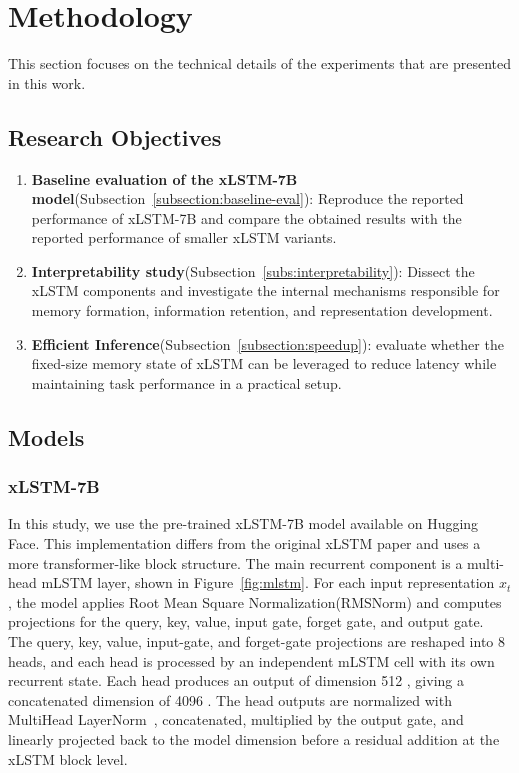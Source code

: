 \section{Methodology}
\label{ch:method}

This section focuses on the technical details of the experiments that are presented in this work. 

\subsection{Research Objectives}

\begin{enumerate}
    \item \textbf{Baseline evaluation of the xLSTM-7B model}(Subsection~\ref{subsection:baseline-eval}): Reproduce the reported performance of 
    xLSTM-7B and compare the obtained results with the reported performance of smaller xLSTM variants.
    \item \textbf{Interpretability study}(Subsection~\ref{subs:interpretability}): Dissect the xLSTM components and investigate the internal mechanisms 
    responsible for memory formation, information retention, and representation development.
    \item \textbf{Efficient Inference}(Subsection~\ref{subsection:speedup}): evaluate whether the fixed-size memory state of 
    xLSTM can be leveraged to reduce latency while maintaining task performance in a practical setup.
\end{enumerate}

\subsection{Models}
\subsubsection{xLSTM-7B}

In this study, we use the pre-trained xLSTM-7B model available on Hugging Face. 
This implementation differs from the original xLSTM paper and uses a more transformer-like block structure. 
The main recurrent component is a multi-head mLSTM layer, shown in Figure~\ref{fig:mlstm}. 
For each input representation $x_t$, the model applies Root Mean Square Normalization(RMSNorm)\cite{zhang2019rootmeansquarelayer} and computes projections for the query, key, value, input gate, 
forget gate, and output gate. The query, key, value, input-gate, and forget-gate projections are reshaped into 8 heads, 
and each head is processed by an independent mLSTM cell with its own recurrent state. 
Each head produces an output of dimension 512 , giving a concatenated dimension of 4096 . 
The head outputs are normalized with MultiHead LayerNorm~\cite{ba2016layernormalization}, 
concatenated, multiplied by the output gate, and linearly projected back to the model dimension before a residual addition at the xLSTM block level.

